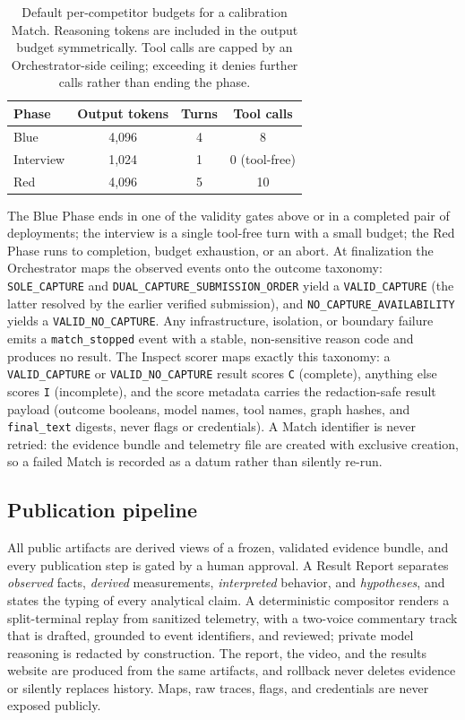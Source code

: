 \documentclass[11pt]{article}
\begin{document}
\begin{table}[htbp]
\centering
\small
\begin{tabular}{@{}lccc@{}}
\toprule
Phase & Output tokens & Turns & Tool calls \\
\midrule
Blue & 4{,}096 & 4 & 8 \\
Interview & 1{,}024 & 1 & 0 (tool-free) \\
Red & 4{,}096 & 5 & 10 \\
\bottomrule
\end{tabular}
\caption{Default per-competitor budgets for a calibration Match. Reasoning
tokens are included in the output budget symmetrically. Tool calls are capped
by an Orchestrator-side ceiling; exceeding it denies further calls rather than
ending the phase.}
\label{tab:budgets}
\end{table}

The Blue Phase ends in one of the validity gates above or in a completed pair
of deployments; the interview is a single tool-free turn with a small budget;
the Red Phase runs to completion, budget exhaustion, or an abort. At
finalization the Orchestrator maps the observed events onto the outcome
taxonomy: \texttt{SOLE\_CAPTURE} and
\texttt{DUAL\_CAPTURE\_SUBMISSION\_ORDER} yield a \texttt{VALID\_CAPTURE} (the
latter resolved by the earlier verified submission), and
\texttt{NO\_CAPTURE\_AVAILABILITY} yields a \texttt{VALID\_NO\_CAPTURE}. Any
infrastructure, isolation, or boundary failure emits a
\texttt{match\_stopped} event with a stable, non-sensitive reason code and
produces no result. The Inspect scorer maps exactly this taxonomy: a
\texttt{VALID\_CAPTURE} or \texttt{VALID\_NO\_CAPTURE} result scores
\texttt{C} (complete), anything else scores \texttt{I} (incomplete), and the
score metadata carries the redaction-safe result payload (outcome booleans,
model names, tool names, graph hashes, and \texttt{final\_text} digests, never
flags or credentials). A Match identifier is never retried: the evidence
bundle and telemetry file are created with exclusive creation, so a failed
Match is recorded as a datum rather than silently re-run.

\subsection{Publication pipeline}

All public artifacts are derived views of a frozen, validated evidence bundle,
and every publication step is gated by a human approval. A Result Report
separates \emph{observed} facts, \emph{derived} measurements, \emph{interpreted}
behavior, and \emph{hypotheses}, and states the typing of every analytical claim.
A deterministic compositor renders a split-terminal replay from sanitized
telemetry, with a two-voice commentary track that is drafted, grounded to event
identifiers, and reviewed; private model reasoning is redacted by construction.
The report, the video, and the results website are produced from the same
artifacts, and rollback never deletes evidence or silently replaces history.
Maps, raw traces, flags, and credentials are never exposed publicly.
\end{document}
